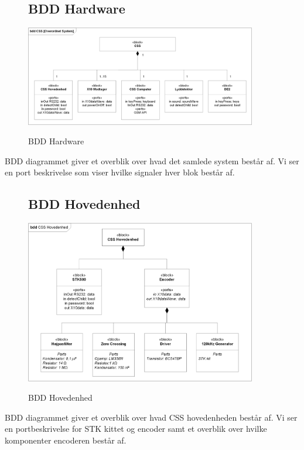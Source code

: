 \begin{figure}[htbp] \centering
\subsection{BDD Hardware}
{\includegraphics[width=0.9\textwidth]{billeder/diagrammer/BDD_Hardware}}
\caption{BDD Hardware}
\label{lab:bddhardware}
\end{figure}
BDD diagrammet giver et overblik over hvad det samlede system består af. Vi ser en port beskrivelse som viser hvilke signaler hver blok består af.

\begin{figure}[htbp] \centering
\subsection{BDD Hovedenhed}
{\includegraphics[width=0.9\textwidth]{billeder/diagrammer/BDD_Hovedenhed}}
\caption{BDD Hovedenhed}
\label{lab:bddhovedenhed}
\end{figure}
BDD diagrammet giver et overblik over hvad CSS hovedenheden består af. Vi ser en portbeskrivelse for STK kittet og encoder samt et overblik over hvilke komponenter encoderen består af. 

